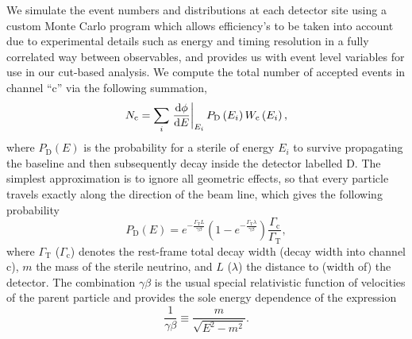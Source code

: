 \documentclass[11pt, a4paper]{article}
\def\ster{\ensuremath N}
\begin{document}
We simulate the event numbers and distributions at each detector site using a custom
Monte Carlo program which allows efficiency's to be taken into account due to
experimental details such as energy and timing resolution in a fully correlated
way between observables, and provides us with event level variables for use in
our cut-based analysis. We compute the total number of accepted events in
channel ``$\text{c}$'' via the following summation,
%
\[ \ster_\text{c} = \sum_{i} \left .
\frac{\mathrm{d}\phi}{\mathrm{d}E}\right|_{E_i} P_\text{D}\left(E_i\right)
W_\text{c}\left(E_i\right),  \]
%
where $P_\text{D}(E)$ is the probability for a sterile of energy $E_i$ to survive propagating the baseline
and then subsequently decay inside the detector labelled $\text{D}$. The simplest
approximation is to ignore all geometric effects, so that every particle
travels exactly along the direction of the beam line, which gives the following
probability 
%
\[ P_\text{D}\left(E\right) = e^{-\frac{\Gamma_\text{T}L}{\gamma\beta}}\left(
1-
e^{-\frac{\Gamma_\text{T}\lambda}{\gamma\beta}}\right)\frac{\Gamma_\text{c}}{\Gamma_\text{T}},
\label{eq:prob} \]
%
where $\Gamma_\text{T}$ ($\Gamma_\text{c}$) denotes the rest-frame total decay
width (decay width into channel $\text{c}$), $m$ the mass of the sterile
neutrino, and $L$ ($\lambda$) the distance to (width of) the detector. The
combination $\gamma\beta$ is the usual special relativistic function of
velocities of the parent particle and provides the sole energy dependence of
the expression
%
\[   \frac{1}{\gamma\beta} \equiv \frac{m}{\sqrt{E^2-m^2}}. \]
%
\end{document}
